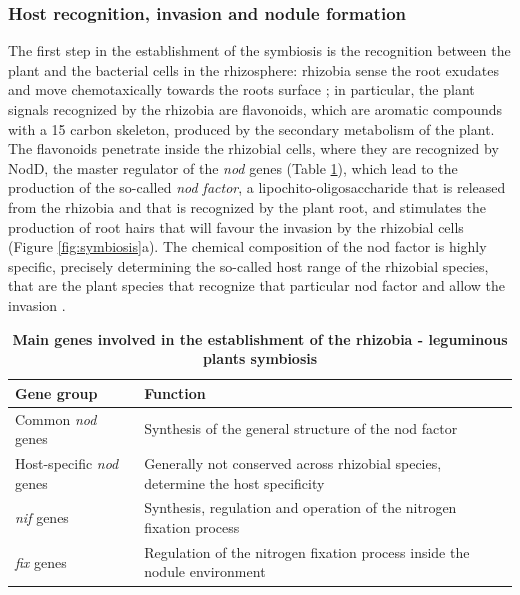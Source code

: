 \subsubsection{Host recognition, invasion and nodule formation}
The first step in the establishment of the symbiosis is the recognition between the plant and the bacterial cells in the rhizosphere: rhizobia sense the root exudates and move chemotaxically towards the roots surface \cite{barbour1991chemotaxis}\cite{caetano1992growth}; in particular, the plant signals recognized by the rhizobia are flavonoids, which are aromatic compounds with a 15 carbon skeleton, produced by the secondary metabolism of the plant. The flavonoids penetrate inside the rhizobial cells, where they are recognized by NodD, the master regulator of the \textit{nod} genes (Table \ref{tab:bnfgenes}), which lead to the production of the so-called \textit{nod factor}, a lipochito-oligosaccharide that is released from the rhizobia and that is recognized by the plant root, and stimulates the production of root hairs that will favour the invasion by the rhizobial cells \cite{shaw2006perception} (Figure \ref{fig:symbiosis}a). The chemical composition of the nod factor is highly specific, precisely determining the so-called host range of the rhizobial species, that are the plant species that recognize that particular nod factor and allow the invasion \cite{kondorosi1984physical}.

\begin{table}
    \begin{tabularx}{\textwidth}{|p{4cm}|p{8.2cm}|}
        \hline
        Gene group              & Function                                                                         \\ \hline
        Common \textit{nod} genes        & Synthesis of the general structure of the nod factor                             \\ 
        Host-specific \textit{nod} genes & Generally not conserved across rhizobial species, determine the host specificity \\ 
        \textit{nif} genes               & Synthesis, regulation and operation of the nitrogen fixation process             \\ 
        \textit{fix} genes               & Regulation of the nitrogen fixation process inside the nodule environment        \\
        \hline
    \end{tabularx}
	\caption{\label{tab:bnfgenes}\textbf{Main genes involved in the establishment of the rhizobia - leguminous plants symbiosis}}
\end{table}


